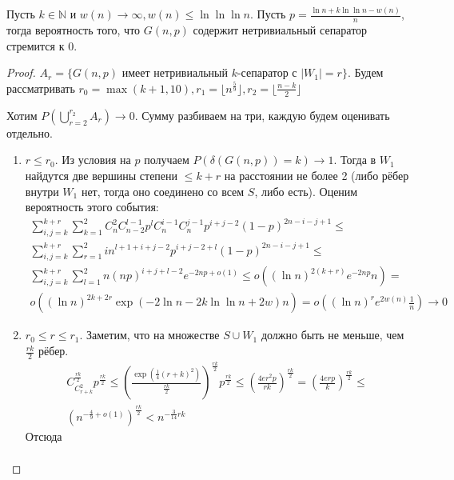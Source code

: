 \documentclass{article}
\begin{document}
\begin{lemma}[О сепараторах]
	Пусть $k \in \mathbb{N}$ и $w(n) \rightarrow \infty, w(n) \le \ln \ln \ln n$. Пусть $p = \frac{\ln
	n + k \ln \ln n - w(n)}{n}$, тогда вероятность того, что $G(n, p)$ содержит нетривиальный
	сепаратор стремится к 0.
\end{lemma}
\begin{proof}
	$A_r = \{G(n, p) \text{ имеет нетривиальный $k$-сепаратор с $|W_1|=r$}\}$. Будем рассматривать
	$r_0 = \max(k+1,10), r_1 = \lfloor n^\frac{5}{9} \rfloor, r_2 = \lfloor \frac{n-k}{2} \rfloor$

	Хотим $P\left(\bigcup\limits_{r=2}^{r_2}A_r\right) \rightarrow 0$. Сумму разбиваем на три, каждую
	будем оценивать отдельно.

	\begin{enumerate}
		\item $r \le r_0$. Из условия на $p$ получаем $P(\delta(G(n,p))=k) \rightarrow 1$. Тогда в $W_1$
			найдутся две вершины степени $\le k + r$ на расстоянии не более 2 (либо рёбер внутри $W_1$
			нет, тогда оно соединено со всем $S$, либо есть). Оценим вероятность этого события:
			\begin{multline*}
				\sum\limits_{i,j=k}^{k+r} \sum\limits_{k=1}^2 C_n^2 C_{n-2}^{l-1} p^l C_n^{i-1} C_n^{j-1}
				p^{i+j-2} (1-p)^{2n-i-j+1} \le \\
				\sum\limits_{i,j=k}^{k+r}\sum\limits_{r=1}^2i n^{l+1+i+j-2} p^{i+j-2+l} (1-p)^{2n-i-j+1} \le
				\\
				\sum\limits_{i,j=k}^{k+r} \sum\limits_{l=1}^2 n (np)^{i+j+l-2} e^{-2np + o(1)}
				\le o\left((\ln n)^{2(k+r)} e^{-2np} n\right) = \\
				o\left( (\ln n)^{2k + 2r} \exp(-2\ln n - 2k \ln \ln n + 2w) n \right) = o\left((\ln n)^r
				e^{2w(n)} \frac{1}{n} \right) \rightarrow 0
			\end{multline*}
		\item $r_0 \le r \le r_1$. Заметим, что на множестве $S \cup W_1$ должно быть не меньше, чем
			$\frac{rk}{2}$ рёбер.
			\begin{multline*}
				C_{C_{r+k}^2}^{\frac{rk}{2}} p^\frac{rk}{2} \le \left(
				\frac{\exp(\frac{1}{4}(r+k)^2)}{\frac{rk}{2}}\right)^\frac{rk}{2} p^\frac{rk}{2} \le
				\left(\frac{4er^2p}{rk}\right)^\frac{rk}{2} = \left(\frac{4erp}{k}\right)^\frac{rk}{2} \le\\
				\left(n^{-\frac{4}{9} + o(1)}\right)^\frac{rk}{2} < n^{-\frac{3}{14}rk}
			\end{multline*}
			Отсюда 
			\begin{multline*}

\end{multline*}
\end{enumerate}
\end{proof}
\end{document}
